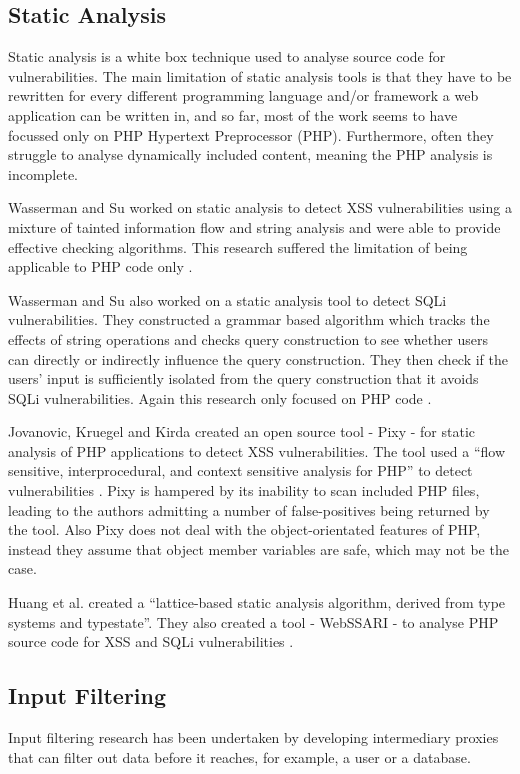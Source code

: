\documentclass[12pt,a4paper]{article}
\begin{document}
\subsection{Static Analysis}
Static analysis is a white box technique used to analyse source code for vulnerabilities.  The main limitation of static analysis tools is that they have to be rewritten for every different programming language and/or framework a web application can be written in, and so far, most of the work seems to have focussed only on PHP Hypertext Preprocessor (PHP).  Furthermore, often they struggle to analyse dynamically included content, meaning the PHP analysis is incomplete.

Wasserman and Su worked on static analysis to detect XSS vulnerabilities using a mixture of tainted information flow and  string analysis and were able to provide effective checking algorithms. This research suffered the limitation of being applicable to PHP code only \cite{Wassermann2008}.

Wasserman and Su also worked on a static analysis tool to detect SQLi vulnerabilities.  They constructed a grammar based algorithm which tracks the effects of string operations and checks query construction to see whether users can directly or indirectly influence the query construction.   They then check if the users’ input is sufficiently  isolated from the query construction that it avoids SQLi vulnerabilities. Again this research only focused on PHP code \cite{Wassermann2007}.

Jovanovic, Kruegel and  Kirda created an open source tool - Pixy - for static analysis of PHP applications to detect XSS vulnerabilities.  The tool used a “flow sensitive, interprocedural, and context sensitive analysis for PHP” to detect vulnerabilities \cite{Jovanovic2006}.  Pixy is hampered by its inability to scan included PHP files, leading to the authors admitting a number of false-positives being returned by the tool.  Also Pixy does not deal with the object-orientated features of PHP, instead they assume that object member variables are safe, which may not be the case.

Huang et al. created a “lattice-based static analysis algorithm, derived from type systems and typestate”.  They also created a tool - WebSSARI - to analyse PHP source code for XSS and SQLi vulnerabilities \cite{Huang2004}.

\subsection{Input Filtering}
Input filtering research has been undertaken by developing intermediary proxies that can filter out data before it reaches, for example, a user or a database.
\end{document}
